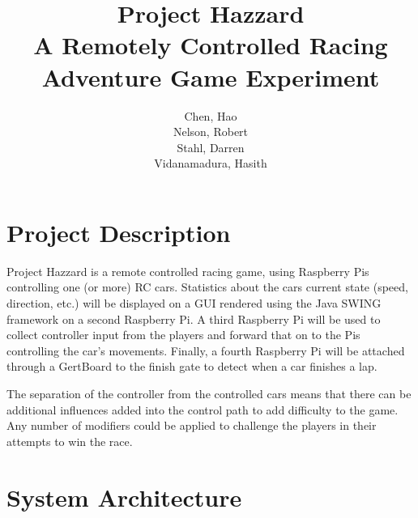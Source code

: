 \documentclass[letterpaper,fleqn]{article}
\title{Project Hazzard\\ A Remotely Controlled Racing Adventure Game Experiment}
\author{Chen, Hao\\Nelson, Robert\\Stahl, Darren\\Vidanamadura, Hasith}
\begin{document}
\maketitle
{}
\pagebreak
{}

\section{Project Description}
Project Hazzard is a remote controlled racing game, using Raspberry Pis controlling one (or more) RC cars. Statistics about the cars current state (speed, direction, etc.) will be displayed on a GUI rendered using the Java \textsc{SWING} framework on a second Raspberry Pi. A third Raspberry Pi will be used to collect controller input from the players and forward that on to the Pis controlling the car's movements. Finally, a fourth Raspberry Pi will be attached through a GertBoard to the finish gate to detect when a car finishes a lap.

The separation of the controller from the controlled cars means that there can be additional influences added into the control path to add difficulty to the game. Any number of modifiers could be applied to challenge the players in their attempts to win the race.

\section{System Architecture}
\end{document}
